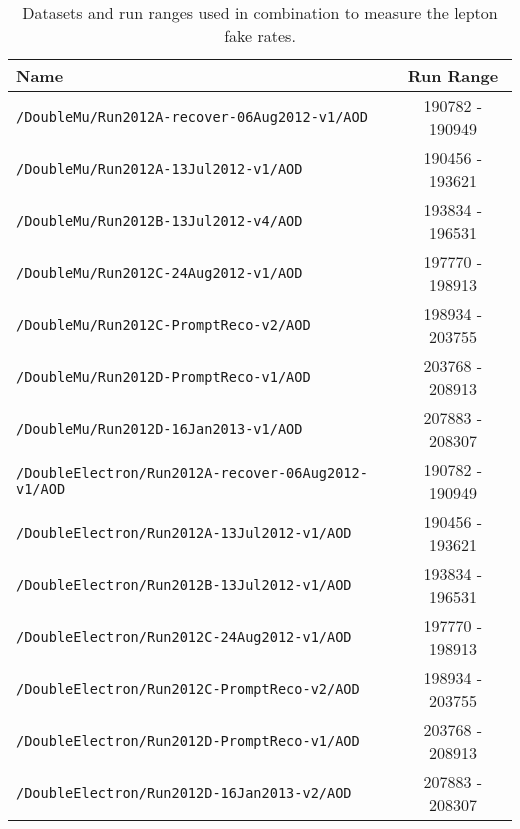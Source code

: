 \begin{table}[hbt]
\caption{\label{tab:FRDsets}Datasets and run ranges used in combination to measure the lepton fake rates.}
\begin{center}
\begin{tabular}{lc}\hline\hline
Name		& Run Range \\ \hline
\verb=/DoubleMu/Run2012A-recover-06Aug2012-v1/AOD=                 &   190782 - 190949\\ 
\verb=/DoubleMu/Run2012A-13Jul2012-v1/AOD=                                  &  190456 - 193621                     \\ 
\verb=/DoubleMu/Run2012B-13Jul2012-v4/AOD=                                  &  193834 - 196531                     \\ 
\verb=/DoubleMu/Run2012C-24Aug2012-v1/AOD=                                &  197770 - 198913 \\  
\verb=/DoubleMu/Run2012C-PromptReco-v2/AOD=                               &  198934 - 203755                     \\ 
\verb=/DoubleMu/Run2012D-PromptReco-v1/AOD=                               &  203768 - 208913  \\
\verb=/DoubleMu/Run2012D-16Jan2013-v1/AOD=                                 &  207883 - 208307  \\

\verb=/DoubleElectron/Run2012A-recover-06Aug2012-v1/AOD=         &   190782 - 190949                    \\ 
\verb=/DoubleElectron/Run2012A-13Jul2012-v1/AOD=                         & 190456 - 193621                      \\ 
\verb=/DoubleElectron/Run2012B-13Jul2012-v1/AOD=                         &  193834 - 196531 \\ 
\verb=/DoubleElectron/Run2012C-24Aug2012-v1/AOD=                       &   197770 - 198913                    \\ 
\verb=/DoubleElectron/Run2012C-PromptReco-v2/AOD=                     &    198934 - 203755                  \\ 
\verb=/DoubleElectron/Run2012D-PromptReco-v1/AOD=                      &  203768 - 208913  \\
\verb=/DoubleElectron/Run2012D-16Jan2013-v2/AOD=                        &   207883 - 208307 \\


\end{tabular}
\end{center}
\end{table}
